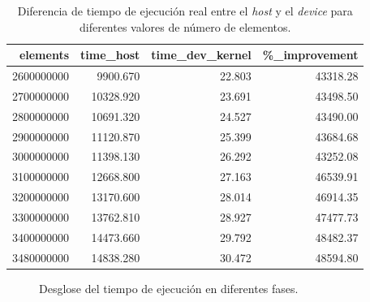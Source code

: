 \documentclass{article}
\begin{document}
			\begin{table}[H]
				\begin{adjustbox}{width=\textwidth, keepaspectratio}
					\begin{tabular}{|r|r|r|r|} \hline
						elements & time\_host & time\_dev\_kernel & \%\_improvement \\ \hline
						2600000000 & 9900.670 & 22.803 & 43318.28 \\ \hline
						2700000000 & 10328.920 & 23.691 & 43498.50 \\ \hline
						2800000000 & 10691.320 & 24.527 & 43490.00 \\ \hline
						2900000000 & 11120.870 & 25.399 & 43684.68 \\ \hline
						3000000000 & 11398.130 & 26.292 & 43252.08 \\ \hline
						3100000000 & 12668.800 & 27.163 & 46539.91 \\ \hline
						3200000000 & 13170.600 & 28.014 & 46914.35 \\ \hline
						3300000000 & 13762.810 & 28.927 & 47477.73 \\ \hline
						3400000000 & 14473.660 & 29.792 & 48482.37 \\ \hline
						3480000000 & 14838.280 & 30.472 & 48594.80 \\ \hline
					\end{tabular}
				\end{adjustbox}
				\caption{Diferencia de tiempo de ejecución real entre el \textit{host} y el \textit{device} para diferentes valores de número de elementos.}
				\label{tab:resultados4_3}
			\end{table}

			\begin{figure}
				\centering
				\caption{Desglose del tiempo de ejecución en diferentes fases.}
				\label{fig:time_breakdown_4}
			\end{figure}
\end{document}
